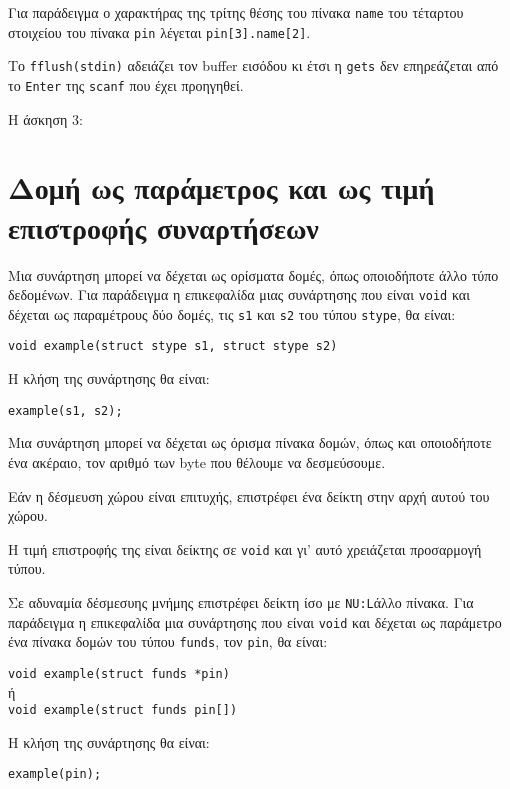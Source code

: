 \documentclass[14pt, fleqn, leqno]{extreport}
\begin{document}
Για παράδειγμα ο χαρακτήρας της τρίτης θέσης του πίνακα \lstinline{name} του τέταρτου στοιχείου του πίνακα \lstinline{pin} λέγεται \lstinline{pin[3].name[2]}.

Το \lstinline{fflush(stdin)} αδειάζει τον buffer εισόδου κι έτσι η \lstinline{gets} δεν επηρεάζεται από το \lstinline{Enter} της \lstinline{scanf} που έχει προηγηθεί.

\newpage
Η άσκηση 3:


\section{Δομή ως παράμετρος και ως τιμή επιστροφής συναρτήσεων}

Μια συνάρτηση μπορεί να δέχεται ως ορίσματα δομές, όπως οποιοδήποτε άλλο τύπο δεδομένων. Για παράδειγμα η επικεφαλίδα μιας συνάρτησης που είναι \lstinline{void} και δέχεται ως παραμέτρους δύο δομές, τις \lstinline{s1} και \lstinline{s2} του τύπου \lstinline{stype}, θα είναι:
\begin{center}
    \lstinline{void example(struct stype s1, struct stype s2)}
\end{center}

Η κλήση της συνάρτησης θα είναι:
\begin{center}
    \lstinline{example(s1, s2);}
\end{center}

Μια συνάρτηση μπορεί να δέχεται ως όρισμα πίνακα δομών, όπως και οποιοδήποτε  ένα ακέραιο, τον αριθμό των byte που θέλουμε να δεσμεύσουμε.

Εάν η δέσμευση χώρου είναι επιτυχής, επιστρέφει ένα δείκτη στην αρχή αυτού του χώρου.

Η τιμή επιστροφής της είναι δείκτης σε \lstinline{void} και γι' αυτό χρειάζεται προσαρμογή τύπου.

Σε αδυναμία δέσμεσυης μνήμης επιστρέφει δείκτη ίσο με \lstinline{NU:L}άλλο πίνακα. Για παράδειγμα η επικεφαλίδα μια συνάρτησης που είναι \lstinline{void} και δέχεται ως παράμετρο ένα πίνακα δομών του τύπου \lstinline{funds}, τον \lstinline{pin}, θα είναι:
\begin{center}
    \lstinline{void example(struct funds *pin)}\\
    ή\\
    \lstinline{void example(struct funds pin[])}
\end{center}

Η κλήση της συνάρτησης θα είναι:
\begin{center}
    \lstinline{example(pin);}
\end{center}
\end{document}
